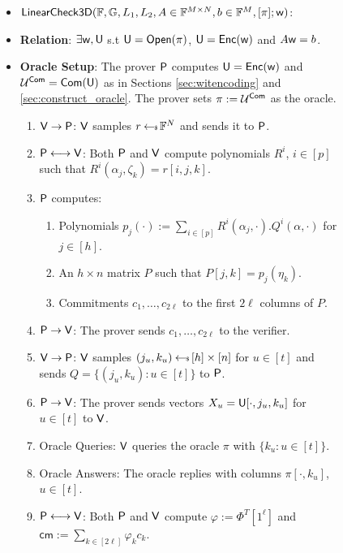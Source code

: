 \begin{figure}[h!]
\centering
\begin{framed}
\begin{itemize}
\item {$\mathsf{LinearCheck3D}(\mathbb{F},\mathbb{G},L_1,L_2,A\in \mathbb{F}^{M\times N},b\in \mathbb{F}^M,[\pi];\mathsf{w})$}:
\item {\bf Relation}: $\exists \mathsf{w},\mathsf{U}$ s.t $\mathsf{U}=\mathsf{Open}(\pi)$,
$\mathsf{U}=\mathsf{Enc}(\mathsf{w})$ and $A\mathsf{w} = b$.
\item {\bf Oracle Setup}: The prover $\mathsf{P}$ computes $\mathsf{U} = \mathsf{Enc}(\mathsf{w})$ and
$\mathcal{U}^{\mathsf{Com}} = \mathsf{Com}(\mathsf{U})$ as in Sections \ref{sec:witencoding} and
\ref{sec:construct_oracle}. The prover sets $\pi := \mathcal{U}^{\mathsf{Com}}$ as the oracle.
\begin{enumerate}[{\rm 1.}]
\item $\mathsf{V}\rightarrow\mathsf{P}$: $\mathsf{V}$ samples $r\hskip2.3pt{\gets\!\!\mbox{\tiny${\$}$\normalsize}}\, \mathbb{F}^N$ and
sends it to $\mathsf{P}$.
\item $\mathsf{P}\longleftrightarrow\mathsf{V}$: Both $\mathsf{P}$ and $\mathsf{V}$
compute polynomials $R^i$, $i\in [p]$ such that
$R^i(\alpha_j,\zeta_k)=r[i,j,k]$. 
\item $\mathsf{P}$ computes:
	\begin{enumerate}
	\item Polynomials $p_j(\cdot) := \sum_{i\in
[p]}R^i(\alpha_j,\cdot).Q^i(\alpha,\cdot)$ for $j\in [h]$.
	\item An $h\times n$ matrix $P$ such that $P[j,k]=p_j(\eta_k)$.
	\item Commitments $c_1,\ldots,c_{2\ell}$ to the first $2\ell$
columns of $P$.
	\end{enumerate}
\item $\mathsf{P}\rightarrow\mathsf{V}$: The prover sends $c_1,\ldots,c_{2\ell}$ to
the verifier.
\item $\mathsf{V}\rightarrow\mathsf{P}$: $\mathsf{V}$ samples $(j_u,k_u)\hskip2.3pt{\gets\!\!\mbox{\tiny${\$}$\normalsize}}\, [h]\times
[n]$ for $u\in [t]$ and sends $Q=\{(j_u,k_u):u\in [t]\}$ to $\mathsf{P}$.
\item $\mathsf{P}\rightarrow\mathsf{V}$: The prover sends vectors
$X_u=\mathsf{U}[\cdot,j_u,k_u]$ for $u\in [t]$ to $\mathsf{V}$.
\item Oracle Queries: $\mathsf{V}$ queries the oracle $\pi$ with $\{k_u:u\in
[t]\}$. 
\item Oracle Answers: The oracle replies with columns $\pi[\cdot,k_u]$, $u\in
[t]$.
\item $\mathsf{P}\longleftrightarrow\mathsf{V}$: Both $\mathsf{P}$ and $\mathsf{V}$
compute $\varphi := \Phi^T[1^\ell]$ and $\mathsf{cm} := \sum_{k\in
[2\ell]}\varphi_kc_k$.

\end{enumerate}
\end{itemize}
\end{framed}
\end{figure}
